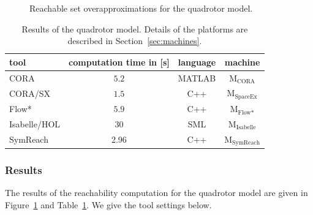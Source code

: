 \documentclass[EPiC]{easychair}
\begin{document}
\begin{figure}[htb]
{  \label{fig:quadrotor:isabelle}}

\caption{Reachable set overapproximations for the quadrotor model.}
\label{fig:quadrotor}
\end{figure}


\begin{table}[t]
	\setlength{\tabcolsep}{4pt}
	\renewcommand{\arraystretch}{1.2}
	\centering
	\caption{Results of the quadrotor model. Details of the platforms are described in Section~\ref{sec:machines}.}
	\begin{tabular}[c]{lccc}
	\hline
		 \textbf{tool} & \textbf{computation time in [s]} & \textbf{language} & \textbf{machine} \\
		 \hline
         CORA & $5.2$ & MATLAB & M$_{\text{CORA}}$ \\
         CORA/SX & $1.5$ & C++ & M$_{\text{SpaceEx}}$ \\
         Flow* & $5.9$ & C++ & M$_{\text{Flow*}}$ \\
         Isabelle/HOL & 30 & SML & M$_{\text{Isabelle}}$ \\
         SymReach & 2.96 & C++ & M$_{\text{SymReach}}$ \\
		 \hline
	\end{tabular}
	\label{tab:compTimes:quadrotor}
\end{table}


\subsubsection{Results}


The results of the reachability computation for the quadrotor model are given in Figure~\ref{fig:quadrotor} and Table~\ref{tab:compTimes:quadrotor}. We give the tool settings below.
\end{document}

